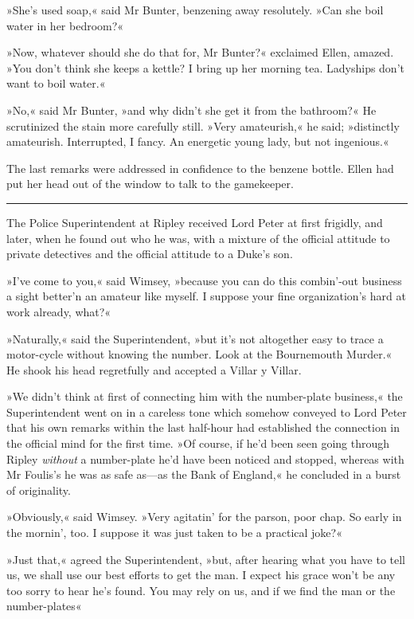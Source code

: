 »She's used soap,« said Mr Bunter, benzening away resolutely. »Can she boil water in her bedroom?«

»Now, whatever should she do that for, Mr Bunter?« exclaimed Ellen, amazed. »You don't think she keeps a kettle? I bring up her morning tea. Ladyships don't want to boil water.«

»No,« said Mr Bunter, »and why didn't she get it from the bathroom?« He scrutinized the stain more carefully still. »Very amateurish,« he said; »distinctly amateurish. Interrupted, I fancy. An energetic young lady, but not ingenious.«

The last remarks were addressed in confidence to the benzene bottle.  Ellen had put her head out of the window to talk to the gamekeeper.

\noindent\hfil\rule{0.5\textwidth}{.4pt}\hfil

The Police Superintendent at Ripley received Lord Peter at first frigidly, and later, when he found out who he was, with a mixture of the official attitude to private detectives and the official attitude to a Duke's son.

»I've come to you,« said Wimsey, »because you can do this combin'-out business a sight better'n an amateur like myself. I suppose your fine organization's hard at work already, what?«

»Naturally,« said the Superintendent, »but it's not altogether easy to trace a motor-cycle without knowing the number. Look at the Bournemouth Murder.« He shook his head regretfully and accepted a Villar y Villar.

»We didn't think at first of connecting him with the number-plate business,« the Superintendent went on in a careless tone which somehow conveyed to Lord Peter that his own remarks within the last half-hour had established the connection in the official mind for the first time. »Of course, if he'd been seen going through Ripley \textit{without} a number-plate he'd have been noticed and stopped, whereas with Mr  Foulis's he was as safe as\allowbreak---\allowbreak as the Bank of England,« he concluded in a burst of originality.

»Obviously,« said Wimsey. »Very agitatin' for the parson, poor chap.  So early in the mornin', too. I suppose it was just taken to be a practical joke?«

»Just that,« agreed the Superintendent, »but, after hearing what you have to tell us, we shall use our best efforts to get the man. I expect his grace won't be any too sorry to hear he's found. You may rely on us, and if we find the man or the number-plates\longdash«

